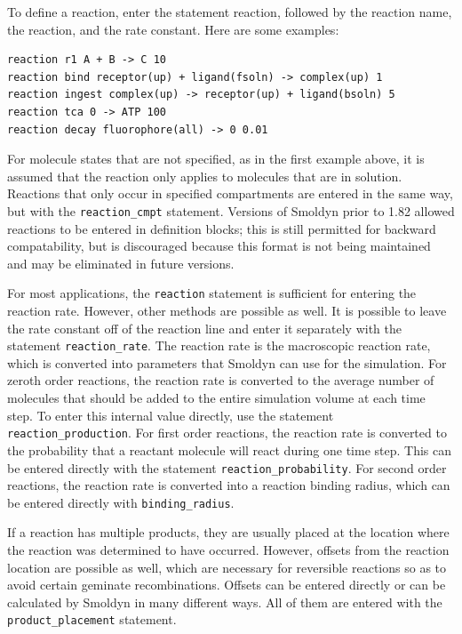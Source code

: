 \documentclass {book}
\newcommand {\ttt} {\texttt}
\begin{document}
To define a reaction, enter the statement reaction, followed by the reaction name, the reaction, and the rate constant. Here are some examples:

\begin{lstlisting}[style=SSAC]
reaction r1 A + B -> C 10
reaction bind receptor(up) + ligand(fsoln) -> complex(up) 1
reaction ingest complex(up) -> receptor(up) + ligand(bsoln) 5
reaction tca 0 -> ATP 100
reaction decay fluorophore(all) -> 0 0.01
\end{lstlisting}

For molecule states that are not specified, as in the first example above, it is assumed that the reaction only applies to molecules that are in solution. Reactions that only occur in specified compartments are entered in the same way, but with the \ttt{reaction\_cmpt} statement. Versions of Smoldyn prior to 1.82 allowed reactions to be entered in definition blocks; this is still permitted for backward compatability, but is discouraged because this format is not being maintained and may be eliminated in future versions.

For most applications, the \ttt{reaction} statement is sufficient for entering the reaction rate. However, other methods are possible as well. It is possible to leave the rate constant off of the reaction line and enter it separately with the statement \ttt{reaction\_rate}. The reaction rate is the macroscopic reaction rate, which is converted into parameters that Smoldyn can use for the simulation. For zeroth order reactions, the reaction rate is converted to the average number of molecules that should be added to the entire simulation volume at each time step. To enter this internal value directly, use the statement \ttt{reaction\_production}. For first order reactions, the reaction rate is converted to the probability that a reactant molecule will react during one time step. This can be entered directly with the statement \ttt{reaction\_probability}. For second order reactions, the reaction rate is converted into a reaction binding radius, which can be entered directly with \ttt{binding\_radius}.

If a reaction has multiple products, they are usually placed at the location where the reaction was determined to have occurred. However, offsets from the reaction location are possible as well, which are necessary for reversible reactions so as to avoid certain geminate recombinations. Offsets can be entered directly or can be calculated by Smoldyn in many different ways. All of them are entered with the \ttt{product\_placement} statement.
\end{document}
